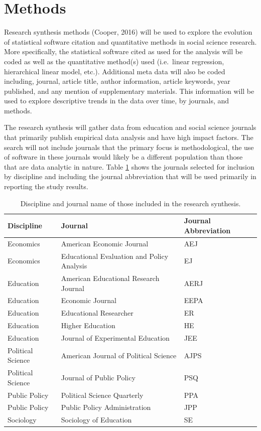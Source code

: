 \documentclass[
  english,
  ,man]{apa7}
\begin{document}
\hypertarget{methods}{%
\section{Methods}\label{methods}}

Research synthesis methods (Cooper, 2016) will be used to explore the evolution of statistical software citation and quantitative methods in social science research. More specifically, the statistical software cited as used for the analysis will be coded as well as the quantitative method(s) used (i.e.~linear regression, hierarchical linear model, etc.). Additional meta data will also be coded including, journal, article title, author information, article keywords, year published, and any mention of supplementary materials. This information will be used to explore descriptive trends in the data over time, by journals, and methods.

The research synthesis will gather data from education and social science journals that primarily publish empirical data analysis and have high impact factors. The search will not include journals that the primary focus is methodological, the use of software in these journals would likely be a different population than those that are data analytic in nature. Table \ref{tab:journals} shows the journals selected for inclusion by discipline and including the journal abbreviation that will be used primarily in reporting the study results.

\begin{table}[!h]

\caption{\label{tab:journals}Discipline and journal name of those included in the research synthesis.}
\centering
\begin{tabular}[t]{lll}
\toprule
Discipline & Journal & Journal Abbreviation\\
\midrule
Economics & American Economic Journal & AEJ\\
Economics & Educational Evaluation and Policy Analysis & EJ\\
Education & American Educational Research Journal & AERJ\\
Education & Economic Journal & EEPA\\
Education & Educational Researcher & ER\\
\addlinespace
Education & Higher Education & HE\\
Education & Journal of Experimental Education & JEE\\
Political Science & American Journal of Political Science & AJPS\\
Political Science & Journal of Public Policy & PSQ\\
Public Policy & Political Science Quarterly & PPA\\
\addlinespace
Public Policy & Public Policy Administration & JPP\\
Sociology & Sociology of Education & SE\\
\bottomrule
\end{tabular}
\end{table}
\end{document}
